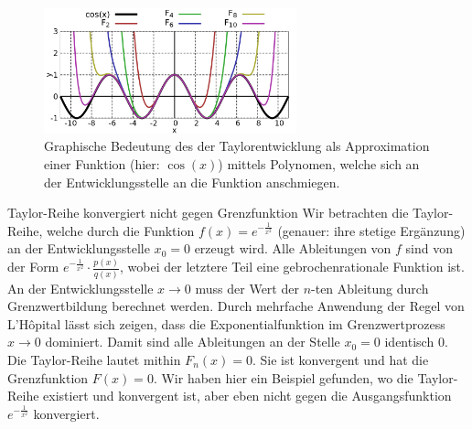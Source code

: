 \begin{figure}
    \centering
    \includegraphics[width=0.65\textwidth]{./gnuplot/taylor-approximation}
    \caption[Approximation einer Funktion mittels Taylorentwicklung]{Graphische Bedeutung des der Taylorentwicklung als Approximation einer Funktion (hier: $\cos(x)$) mittels Polynomen, welche sich an der Entwicklungsstelle an die Funktion anschmiegen.}
    \label{fig:GraphTaylor}
\end{figure}

\begin{example}{Taylor-Reihe konvergiert nicht gegen Grenzfunktion}
    Wir betrachten die Taylor-Reihe, welche durch die Funktion $f(x) = e^{-\frac{1}{x^2}}$ (genauer: ihre stetige Ergänzung) an der Entwicklungsstelle $x_0=0$ erzeugt wird. Alle Ableitungen von $f$ sind von der Form $e^{-\frac{1}{x^2}} \cdot \frac{p(x)}{q(x)}$, wobei der letztere Teil eine gebrochenrationale Funktion ist. An der Entwicklungsstelle $x\to 0$ muss der Wert der $n$-ten Ableitung durch Grenzwertbildung berechnet werden. Durch mehrfache Anwendung der Regel von L'Hôpital lässt sich zeigen, dass die Exponentialfunktion im Grenzwertprozess $x\to 0$ dominiert. Damit sind alle Ableitungen an der Stelle $x_0=0$ identisch $0$. Die Taylor-Reihe lautet mithin $F_n(x) = 0$. Sie ist konvergent und hat die Grenzfunktion $F(x) = 0$. Wir haben hier ein Beispiel gefunden, wo die Taylor-Reihe existiert und konvergent ist, aber eben nicht gegen die Ausgangsfunktion $e^{-\frac{1}{x^2}}$ konvergiert.
\end{example}

